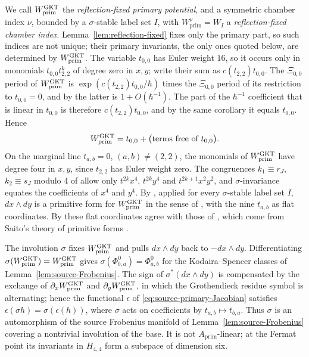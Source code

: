 We call $W^{\mathrm{GKT}}_{\mathrm{prim}}$ the \emph{reflection-fixed primary
potential}, and a symmetric chamber index $\nu$, bounded by a
$\sigma$-stable label set $I$, with $W^\nu_{\mathrm{prim}}=W_I$ a
\emph{reflection-fixed chamber index}.  Lemma~\ref{lem:reflection-fixed}
fixes only the primary part, so such indices are not unique; their primary
invariants, the only ones quoted below, are determined by
$W^{\mathrm{GKT}}_{\mathrm{prim}}$.  The variable $t_{0,0}$ has Euler weight $16$, so it occurs
only in monomials $t_{0,0}t_{2,2}^k$ of degree zero in $x,y$; write their
sum as
$c(t_{2,2})t_{0,0}$.  The $\Xi_{0,0}$ period of $W^{\mathrm{GKT}}_{\mathrm{prim}}$ is
$\exp(c(t_{2,2})t_{0,0}/\hbar)$ times the $\Xi_{0,0}$ period of its
restriction to $t_{0,0}=0$, and by \cite[Cor.~4.17]{grossetal2022open} the
latter is $1+O(\hbar^{-1})$.  The part of the $\hbar^{-1}$ coefficient that is
linear in $t_{0,0}$ is therefore $c(t_{2,2})t_{0,0}$, and by the same corollary
it equals $t_{0,0}$.  Hence
\begin{equation}\label{eq:constant-deformation}
 W^{\mathrm{GKT}}_{\mathrm{prim}}=t_{0,0}+\bigl(\text{terms free of }t_{0,0}\bigr).
\end{equation}
On the marginal line $t_{a,b}=0$, $(a,b)\neq(2,2)$, the monomials of
$W^{\mathrm{GKT}}_{\mathrm{prim}}$ have degree four in $x,y$, since $t_{2,2}$ has
Euler weight zero.  The congruences
$k_1\equiv r_J$, $k_2\equiv s_J$ modulo $4$ of
\cite[Prop.~2.31(a)]{grossetal2022open} allow only $t^{2k}x^4$, $t^{2k}y^4$
and $t^{2k+1}x^2y^2$, and $\sigma$-invariance equates the coefficients of
$x^4$ and $y^4$.  By \cite[Cor.~4.17]{grossetal2022open}, applied for every
$\sigma$-stable label set $I$, $dx\wedge dy$ is a primitive form for
$W^{\mathrm{GKT}}_{\mathrm{prim}}$ in the sense of \cite[Def.~4.3]{grossetal2022open},
with the nine $t_{a,b}$ as flat coordinates.  By
\cite[Rem.~4.5]{grossetal2022open} these flat coordinates agree with those of
\cite[\S2.2]{heetal2022}, which come from Saito's theory of primitive forms
\cite{saito1983period}.

\begin{remark}[Reflection]
\label{rem:reflection-source}
The involution $\sigma$ fixes $W^{\mathrm{GKT}}_{\mathrm{prim}}$ and pulls
$dx\wedge dy$ back to $-dx\wedge dy$.  Differentiating
$\sigma(W^{\mathrm{GKT}}_{\mathrm{prim}})=W^{\mathrm{GKT}}_{\mathrm{prim}}$ gives
$\sigma(\Phi^0_{b,a})=\Phi^0_{a,b}$ for the Kodaira--Spencer classes of
Lemma~\ref{lem:source-Frobenius}.  The sign of $\sigma^*(dx\wedge dy)$ is
compensated by the exchange of $\partial_xW^{\mathrm{GKT}}_{\mathrm{prim}}$ and
$\partial_yW^{\mathrm{GKT}}_{\mathrm{prim}}$, in which the Grothendieck residue symbol
is alternating; hence the functional $\epsilon$ of
\eqref{eq:source-primary-Jacobian} satisfies
$\epsilon(\sigma h)=\sigma(\epsilon(h))$, where $\sigma$ acts on coefficients
by $t_{a,b}\mapsto t_{b,a}$.  Thus $\sigma$ is an automorphism of the source
Frobenius manifold of Lemma~\ref{lem:source-Frobenius} covering a
nontrivial involution of the base.  It is not $A_{\mathrm{prim}}$-linear; at
the Fermat point its invariants in $H_{4,4}$ form a subspace of dimension
six.
\end{remark}

